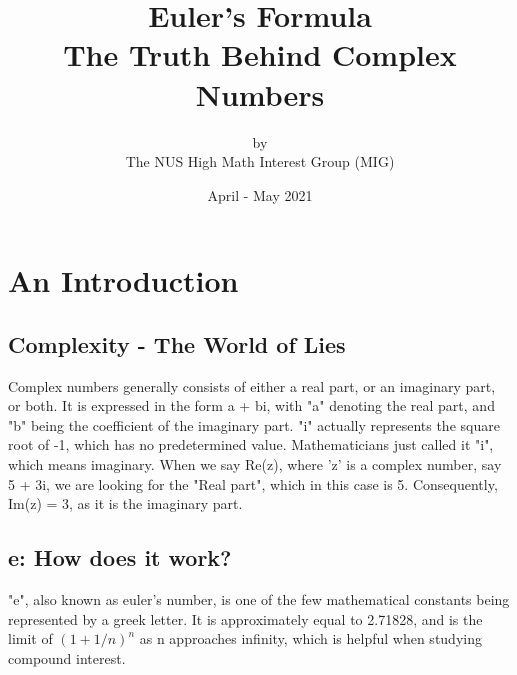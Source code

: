 \documentclass[a4paper,12pt,oneside]{book}
\title{%
  \Huge Euler's Formula \\
  \LARGE  The Truth Behind Complex Numbers
  }
\author{by \\
\Large The NUS High Math Interest Group (MIG) \\
}
\date{\Large April - May 2021}
\begin{document}
\maketitle

\tableofcontents

\part{An Introduction}

\newpage
\chapter{Complexity - The World of Lies}
Complex numbers generally consists of either a real part, or an imaginary part, or both. It is expressed in the form a + bi, with "a" denoting the real part, and "b" being the coefficient of the imaginary part. "i" actually represents the square root of -1, which has no predetermined value. Mathematicians just called it "i", which means imaginary. When we say Re(z), where 'z' is a complex number, say 5 + 3i, we are looking for the "Real part", which in this case is 5. Consequently, Im(z) = 3, as it is the imaginary part.


\newpage
\chapter{e: How does it work?}
"e", also known as euler's number, is one of the few mathematical constants being represented by a greek letter. It is approximately equal to 2.71828, and is the limit of $(1 + 1/n)^n$ as n approaches infinity, which is helpful when studying compound interest. 

\newpage
\end{document}
